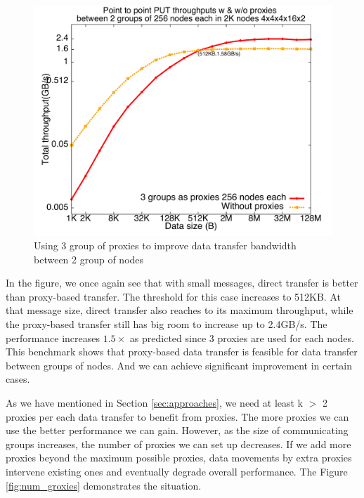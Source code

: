 \begin{figure}[!htb]
\vspace{-0.1in}
\centering
\includegraphics[scale=0.3]{figures/3groxies}
\vspace{-0.2in}
\caption{Using 3 group of proxies to improve data transfer bandwidth between 2 group of nodes}
\vspace{-0.1in}
\label{fig:3groxies}
\end{figure}

In the figure, we once again see that with small messages, direct transfer is better than proxy-based transfer. The threshold for this case increases to 512KB. At that message size, direct transfer also reaches to its maximum throughput, while the proxy-based transfer still has big room to increase up to 2.4GB/s. The performance increases $1.5\times$ as predicted since 3 proxies are used for each nodes. This benchmark shows that proxy-based data transfer is feasible for data transfer between groups of nodes. And we can achieve significant improvement in certain cases.

As we have mentioned in Section \ref{sec:approaches}, we need at least k $>$ 2 proxies per each data transfer to benefit from proxies. The more proxies we can use the better performance we can gain. However, as the size of communicating groups increases, the number of proxies we can set up decreases. If we add more proxies beyond the maximum possible proxies, data movements by extra proxies intervene existing ones and eventually degrade overall performance. The Figure \ref{fig:num_groxies} demonstrates the situation.

